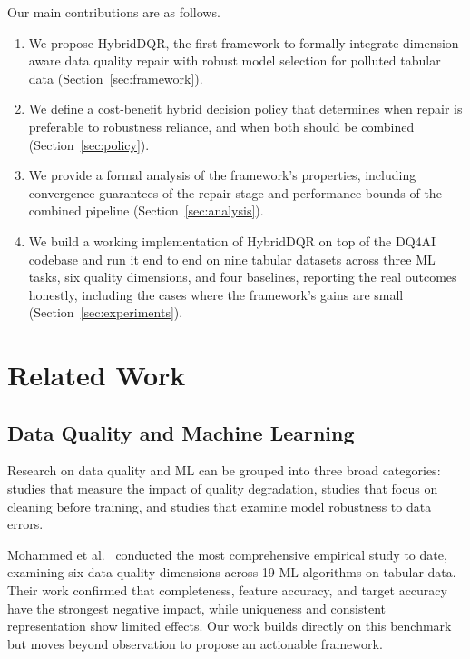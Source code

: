 \documentclass[runningheads]{llncs}
\begin{document}
Our main contributions are as follows.
\begin{enumerate}
  \item We propose HybridDQR, the first framework to formally
        integrate dimension-aware data quality repair with robust
        model selection for polluted tabular data
        (Section~\ref{sec:framework}).
  \item We define a cost-benefit hybrid decision policy that
        determines when repair is preferable to robustness
        reliance, and when both should be combined
        (Section~\ref{sec:policy}).
  \item We provide a formal analysis of the framework's
        properties, including convergence guarantees of the
        repair stage and performance bounds of the combined
        pipeline (Section~\ref{sec:analysis}).
  \item We build a working implementation of HybridDQR on top of
        the DQ4AI codebase and run it end to end on nine tabular
        datasets across three ML tasks, six quality dimensions,
        and four baselines, reporting the real outcomes honestly,
        including the cases where the framework's gains are small
        (Section~\ref{sec:experiments}).
\end{enumerate}

\section{Related Work}
\label{sec:related}

\subsection{Data Quality and Machine Learning}

Research on data quality and ML can be grouped into three broad
categories: studies that measure the impact of quality degradation,
studies that focus on cleaning before training, and studies that
examine model robustness to data errors.

Mohammed et al.~\cite{mohammed2025} conducted the most comprehensive
empirical study to date, examining six data quality dimensions
across 19 ML algorithms on tabular data.
Their work confirmed that completeness, feature accuracy, and target
accuracy have the strongest negative impact, while uniqueness and
consistent representation show limited effects.
Our work builds directly on this benchmark but moves beyond
observation to propose an actionable framework.
\end{document}

